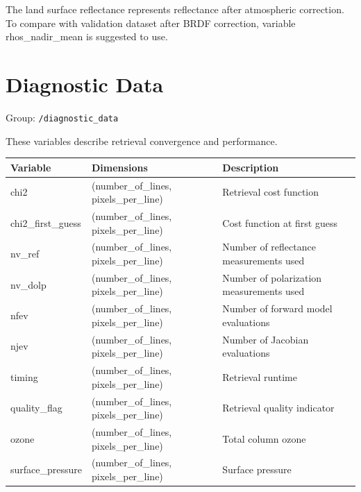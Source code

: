 \documentclass[
  letterpaper,
  open=any]{scrbook}
\begin{document}
The land surface reflectance represents reflectance after atmospheric
correction. To compare with validation dataset after BRDF correction,
variable rhos\_nadir\_mean is suggested to use.

\section{Diagnostic Data}\label{diagnostic-data}

Group: \texttt{/diagnostic\_data}

These variables describe retrieval convergence and performance.

\begin{longtable}[]{@{}
  >{\raggedright\arraybackslash}p{}
  >{\raggedright\arraybackslash}p{}
  >{\raggedright\arraybackslash}p{}@{}}
\toprule\noalign{}
\begin{minipage}[b]{\linewidth}\raggedright
Variable
\end{minipage} & \begin{minipage}[b]{\linewidth}\raggedright
Dimensions
\end{minipage} & \begin{minipage}[b]{\linewidth}\raggedright
Description
\end{minipage} \\
\midrule\noalign{}
\endhead
\bottomrule\noalign{}
\endlastfoot
chi2 & (number\_of\_lines, pixels\_per\_line) & Retrieval cost
function \\
chi2\_first\_guess & (number\_of\_lines, pixels\_per\_line) & Cost
function at first guess \\
nv\_ref & (number\_of\_lines, pixels\_per\_line) & Number of reflectance
measurements used \\
nv\_dolp & (number\_of\_lines, pixels\_per\_line) & Number of
polarization measurements used \\
nfev & (number\_of\_lines, pixels\_per\_line) & Number of forward model
evaluations \\
njev & (number\_of\_lines, pixels\_per\_line) & Number of Jacobian
evaluations \\
timing & (number\_of\_lines, pixels\_per\_line) & Retrieval runtime \\
quality\_flag & (number\_of\_lines, pixels\_per\_line) & Retrieval
quality indicator \\
ozone & (number\_of\_lines, pixels\_per\_line) & Total column ozone \\
surface\_pressure & (number\_of\_lines, pixels\_per\_line) & Surface
pressure \\
\end{longtable}
\end{document}
